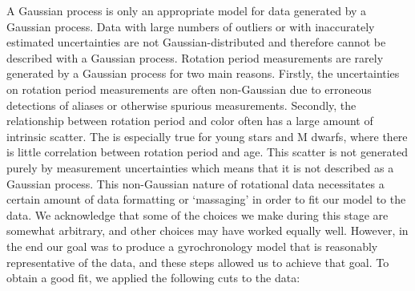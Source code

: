 A Gaussian process is only an appropriate model for data generated by a
Gaussian process.
Data with large numbers of outliers or with inaccurately estimated
uncertainties are not Gaussian-distributed and therefore cannot be described
with a Gaussian process.
Rotation period measurements are rarely generated by a Gaussian process for
two main reasons.
Firstly, the uncertainties on rotation period measurements are often
non-Gaussian due to erroneous detections of aliases or otherwise spurious
measurements.
Secondly, the relationship between rotation period and color often has a large
amount of intrinsic scatter.
The is especially true for young stars and M dwarfs, where there is little
correlation between rotation period and age.
This scatter is not generated purely by measurement uncertainties which means
that it is not described as a Gaussian process.
This non-Gaussian nature of rotational data necessitates a certain amount of
data formatting or `massaging' in order to fit our model to the data.
We acknowledge that some of the choices we make during this stage are somewhat
arbitrary, and other choices may have worked equally well.
However, in the end our goal was to produce a gyrochronology model that is
reasonably representative of the data, and these steps allowed us to achieve
that goal.
To obtain a good fit, we applied the following cuts to the data:
